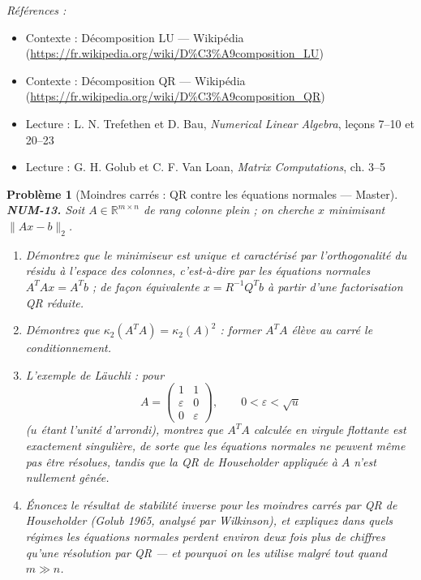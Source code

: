 \documentclass[11pt]{article}
\newtheorem{problem}{Problème}
\newenvironment{refs}{\par\small\noindent\emph{Références :}\begin{itemize}\setlength\itemsep{0pt}}{\end{itemize}\normalsize}
\begin{document}
\begin{refs}
\item Contexte : Décomposition LU --- Wikipédia (\url{https://fr.wikipedia.org/wiki/D%C3%A9composition_LU})
\item Contexte : Décomposition QR --- Wikipédia (\url{https://fr.wikipedia.org/wiki/D%C3%A9composition_QR})
\item Lecture : L. N. Trefethen et D. Bau, \textit{Numerical Linear Algebra}, leçons 7--10 et 20--23
\item Lecture : G. H. Golub et C. F. Van Loan, \textit{Matrix Computations}, ch. 3--5
\end{refs}

\bigskip

\begin{problem}[{Moindres carrés : QR contre les équations normales --- Master}]
\textbf{NUM-13.} Soit $A \in \mathbb{R}^{m \times n}$ de
rang colonne plein ; on cherche $x$ minimisant $\|Ax - b\|_2$.
\begin{enumerate}
\item[(a)] Démontrez que le
minimiseur est unique et caractérisé par l'orthogonalité du résidu à l'espace des
colonnes, c'est-à-dire par les équations normales $A^T A x = A^T b$ ; de façon
équivalente $x = R^{-1} Q^T b$ à partir d'une factorisation QR réduite.
\item[(b)] Démontrez que
$\kappa_2(A^T A) = \kappa_2(A)^2$ : former $A^T A$ élève au carré le
conditionnement.
\item[(c)] L'exemple de Läuchli : pour
\[ A = \begin{pmatrix} 1 & 1 \\ \varepsilon & 0 \\ 0 & \varepsilon \end{pmatrix},
\qquad 0 < \varepsilon < \sqrt{u} \]
($u$ étant l'unité d'arrondi), montrez que $A^T A$ calculée en virgule flottante
est \textit{exactement singulière}, de sorte que les équations normales ne peuvent même
pas être résolues, tandis que la QR de Householder appliquée à $A$ n'est nullement
gênée.
\item[(d)] Énoncez le résultat de stabilité inverse
pour les moindres carrés par QR de Householder (Golub 1965, analysé par Wilkinson), et
expliquez dans quels régimes les équations normales perdent environ deux fois plus de
chiffres qu'une résolution par QR --- et pourquoi on les utilise malgré tout quand
$m \gg n$.
\end{enumerate}

\end{problem}
\end{document}
